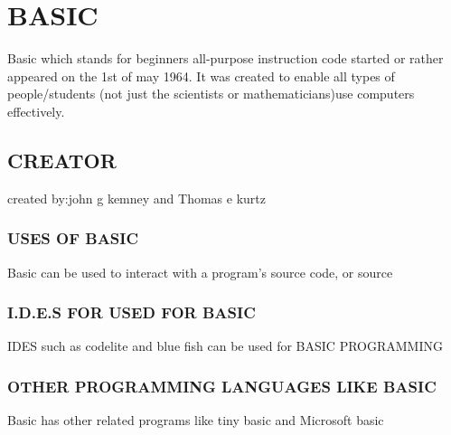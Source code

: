 \documentclass{article}
\begin{document}
	\section{BASIC}
	Basic which stands for beginners all-purpose instruction code started or rather appeared on the 1st of may 1964.
	 It was created to enable all types of people/students (not just the scientists  or mathematicians)use computers effectively.
	 \subsection{CREATOR}
	created by:john g kemney and Thomas e kurtz 
	\subsubsection{USES OF BASIC}
	Basic can be used to interact with a program's source code, or source
	\subsubsection{I.D.E.S FOR USED FOR BASIC}
	IDES such as codelite and blue fish can be used for BASIC PROGRAMMING
	\subsubsection{OTHER PROGRAMMING LANGUAGES LIKE BASIC}
	Basic has other related programs like tiny basic and Microsoft basic
	
	
\end{document}
